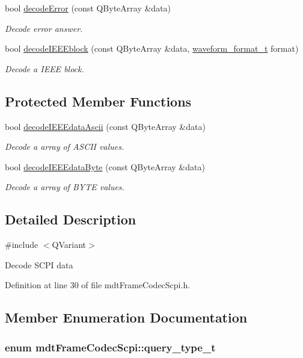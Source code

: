 \begin{DoxyCompactItemize}
bool \hyperlink{classmdt_frame_codec_scpi_a9e38d8afadc7ff37821620feea6b0899}{decodeError} (const QByteArray \&data)
\begin{DoxyCompactList}\small\item\em Decode error answer. \end{DoxyCompactList}\item 
bool \hyperlink{classmdt_frame_codec_scpi_a4b07da48ad126c56db050a379700ac2b}{decodeIEEEblock} (const QByteArray \&data, \hyperlink{classmdt_frame_codec_scpi_a0562eccf33d8cf62e7a73a748a70c475}{waveform\_\-format\_\-t} format)
\begin{DoxyCompactList}\small\item\em Decode a IEEE block. \end{DoxyCompactList}\end{DoxyCompactItemize}
\subsection*{Protected Member Functions}
\begin{DoxyCompactItemize}
\item 
bool \hyperlink{classmdt_frame_codec_scpi_aa6596dc898438be704191ad282d02100}{decodeIEEEdataAscii} (const QByteArray \&data)
\begin{DoxyCompactList}\small\item\em Decode a array of ASCII values. \end{DoxyCompactList}\item 
bool \hyperlink{classmdt_frame_codec_scpi_ab70c6c3d2d91ddff065952b6c2db8345}{decodeIEEEdataByte} (const QByteArray \&data)
\begin{DoxyCompactList}\small\item\em Decode a array of BYTE values. \end{DoxyCompactList}\end{DoxyCompactItemize}


\subsection{Detailed Description}
\#include $<$QVariant$>$ 

Decode SCPI data 

Definition at line 30 of file mdtFrameCodecScpi.h.



\subsection{Member Enumeration Documentation}
\hypertarget{classmdt_frame_codec_scpi_a2dbce7589140e915f3e253c3523b3b9a}{
\subsubsection[{query\_\-type\_\-t}]{\setlength{\rightskip}{0pt plus 5cm}enum {\bf mdtFrameCodecScpi::query\_\-type\_\-t}}}
\label{classmdt_frame_codec_scpi_a2dbce7589140e915f3e253c3523b3b9a}


